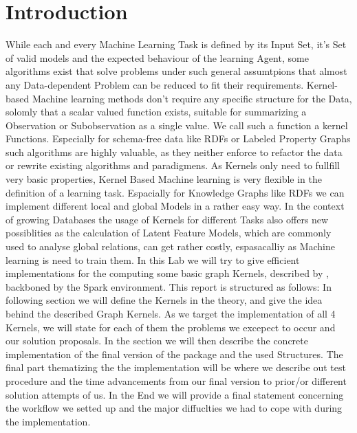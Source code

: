 
\section{Introduction}
While each and every Machine Learning Task is defined by its Input Set, it's Set of valid models and the expected behaviour of the learning Agent, some algorithms exist that solve problems under such general assumtpions that almost any Data-dependent Problem can be reduced to fit their requirements. Kernel-based Machine learning methods don't require any specific structure for the Data, solomly that a scalar valued function exists, suitable for summarizing a Observation or Subobservation as a single value. We call such a function a kernel Functions. Especially for schema-free data like RDFs or Labeled Property Graphs such algorithms are highly valuable, as they neither enforce to refactor the data or rewrite existing algorithms and paradigmens. As Kernels only need to fullfill very basic properties, Kernel Based Machine learning is very flexible in the definition of a learning task. Espacially for Knowledge Graphs like RDFs we can implement different local and global Models in a rather easy way. 
In the context of growing Databases the usage of Kernels for different Tasks also offers new possiblities as the calculation of Latent Feature Models, which are commonly used to analyse global relations, can get rather costly, espasacalliy	as Machine learning is need to train them. 
In this Lab we will try to give efficient implementations for the computing some basic graph Kernels, described by \citet{mainsource}, backboned by the Spark environment.  
This report is structured as follows: In following section  we will define the Kernels in the theory, and give the idea behind the described Graph Kernels\citet{mainsource}. As we target the implementation of all 4 Kernels, we will state for each of them the problems we excepect to occur and our solution proposals. In the section  we will then describe the concrete implementation of the final version of the package and the used Structures. The final part thematizing the the implementation will be  where we describe out test procedure and the time advancements from our final version to prior/or different solution attempts of us. In the End we will provide a final statement concerning the workflow we setted up and the major diffuclties we had to cope with during the implementation.



